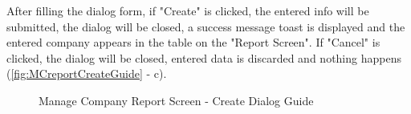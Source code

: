 After filling the dialog form, if "Create" is clicked, the entered info will be submitted, the dialog will be closed, a success message toast is displayed and the entered company appears in the table on the "Report Screen". If "Cancel" is clicked, the dialog will be closed, entered data is discarded and nothing happens (\autoref{fig:MCreportCreateGuide} - c).

\begin{figure}[H]
	\centering
    \hspace{5pt}
    \vspace{10pt}
    \caption{Manage Company Report Screen - Create Dialog Guide}
	\label{fig:MCreportCreateGuide}
\end{figure}

